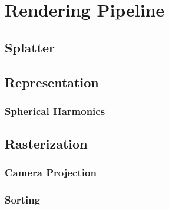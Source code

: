 

\section{Rendering Pipeline}

\subsection{Splatter}

\subsection{Representation}
\subsubsection{Spherical Harmonics}


\subsection{Rasterization}
\subsubsection{Camera Projection}
\subsubsection{Sorting}
